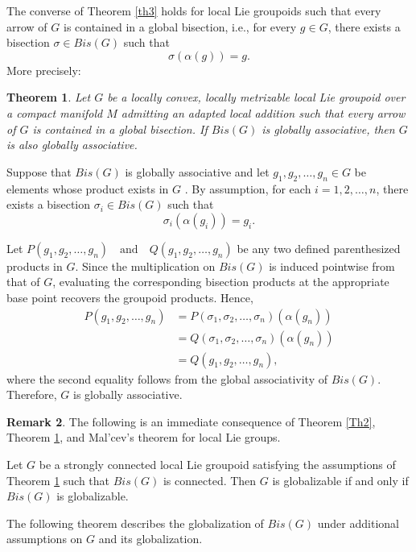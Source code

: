 \documentclass[12pt,a4paper]{amsart}
\makeatletter
\theoremstyle{plain}
\newtheorem{theorem}{Theorem}[section]
\theoremstyle{definition}
\newtheorem{Remark}[theorem]{Remark}
\renewenvironment{proof}[1][\proofname]{%
  \par\vspace{0.1em} %
  \pushQED{\qed}%
  \normalfont \topsep0pt \trivlist
  \item[\hskip\labelsep\itshape #1\@addpunct{.}]\ignorespaces
}{%
  \popQED\endtrivlist\@endpefalse
}
\makeatother
\begin{document}
The converse of Theorem \ref{th3} holds for local Lie groupoids such that every arrow of $G$ is contained in a global bisection, i.e., for every $g \in G$, there exists a bisection $\sigma \in Bis(G)$  such that
$$
\sigma(\alpha(g)) = g.
$$
More precisely:

\begin{theorem}\label{th4}
Let $G$ be a locally convex, locally metrizable local Lie groupoid over a compact manifold $M$ admitting an adapted local addition such that every arrow of $G$ is contained in a global bisection. If $Bis(G)$  is globally associative, then $G$ is also globally associative.
\end{theorem}

\begin{proof}
Suppose that $Bis(G)$  is globally associative and let
$g_1,g_2,\dots,g_n \in G$
be elements whose product exists in $G$ . By assumption, for each $i=1,2,\dots,n$, there exists a bisection
$\sigma_i \in Bis(G)$ 
such that
$$
\sigma_i(\alpha(g_i)) = g_i.
$$

Let
$P(g_1,g_2,\dots,g_n)
\quad \text{and} \quad
Q(g_1,g_2,\dots,g_n)$
be any two defined parenthesized products in $G$. Since the multiplication on $Bis(G)$ is induced pointwise from that of $G$, evaluating the corresponding bisection products at the appropriate base point recovers the groupoid products. Hence,
\begin{align*}
P(g_1,g_2,\dots,g_n)
&=
P(\sigma_1,\sigma_2,\dots,\sigma_n)(\alpha(g_n)) \\
&=
Q(\sigma_1,\sigma_2,\dots,\sigma_n)(\alpha(g_n)) \\
&=
Q(g_1,g_2,\dots,g_n),
\end{align*}
where the second equality follows from the global associativity of $Bis(G)$. Therefore, $G$ is globally associative.
\end{proof}


       
\begin{Remark}
The following is an immediate consequence of Theorem \ref{Th2}, Theorem \ref{th4}, and Mal'cev's theorem for local Lie groups.

Let $G$ be a strongly connected local Lie groupoid satisfying the assumptions of Theorem \ref{th4} such that $ Bis(G)$ is connected. Then $G$ is globalizable if and only if $Bis(G)$ is globalizable.
\end{Remark}
The following theorem describes the globalization of $Bis(G)$  under additional assumptions on $G$ and its globalization.
\end{document}
